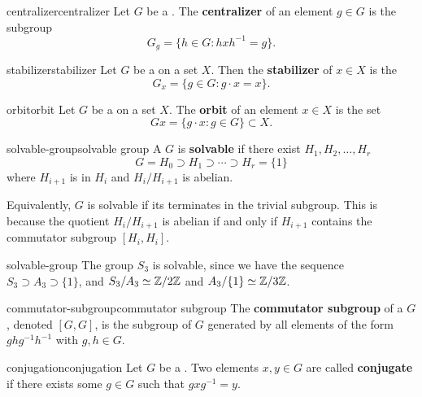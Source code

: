 \begin{topic}{centralizer}{centralizer}
    Let $G$ be a . The \textbf{centralizer} of an element $g \in G$ is the subgroup
    \[ G_g = \{ h \in G : h x h^{-1} = g \} . \]
\end{topic}

\begin{topic}{stabilizer}{stabilizer}
    Let $G$ be a   on a set $X$. Then the \textbf{stabilizer} of $x \in X$ is the 
    \[ G_x = \{ g \in G : g \cdot x = x \} . \]
\end{topic}

\begin{topic}{orbit}{orbit}
    Let $G$ be a   on a set $X$. The \textbf{orbit} of an element $x \in X$ is the set
    \[ Gx = \{ g \cdot x : g \in G \} \subset X . \]
\end{topic}

\begin{topic}{solvable-group}{solvable group}
    A  $G$ is \textbf{solvable} if there exist  $H_1, H_2, \ldots, H_r$
    \[ G = H_0 \supset H_1 \supset \cdots \supset H_r = \{ 1 \} \]
    where $H_{i + 1}$ is  in $H_i$ and $H_i/H_{i + 1}$ is abelian.
    
    Equivalently, $G$ is solvable if its  terminates in the trivial subgroup. This is because the quotient $H_i/H_{i + 1}$ is abelian if and only if $H_{i + 1}$ contains the commutator subgroup $[H_i, H_i]$.
\end{topic}

\begin{example}{solvable-group}
    The group $S_3$ is solvable, since we have the sequence $S_3 \supset A_3 \supset \{ 1 \}$, and $S_3 / A_3 \simeq \mathbb{Z}/2\mathbb{Z}$ and $A_3/\{ 1 \} \simeq \mathbb{Z}/3\mathbb{Z}$.
\end{example}

\begin{topic}{commutator-subgroup}{commutator subgroup}
    The \textbf{commutator subgroup} of a  $G$, denoted $[G, G]$, is the subgroup of $G$ generated by all elements of the form $ghg^{-1}h^{-1}$ with $g, h \in G$.
\end{topic}

\begin{topic}{conjugation}{conjugation}
    Let $G$ be a . Two elements $x, y \in G$ are called \textbf{conjugate} if there exists some $g \in G$ such that $g x g^{-1} = y$.
\end{topic}

